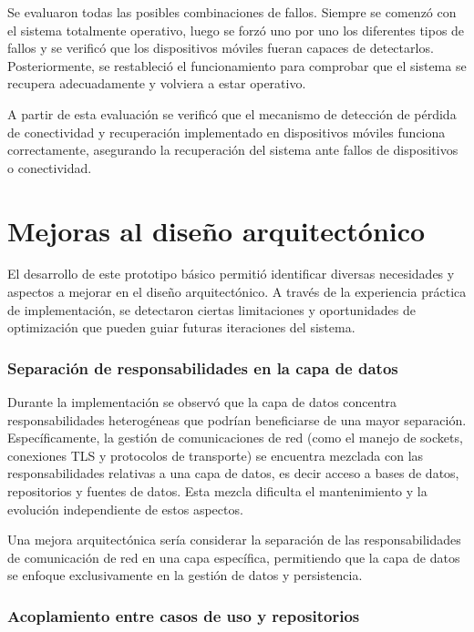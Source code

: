     Se evaluaron todas las posibles combinaciones de fallos. Siempre se comenzó con el sistema totalmente operativo, luego se forzó uno por uno los diferentes tipos de fallos y se verificó que los dispositivos móviles fueran capaces de detectarlos. Posteriormente, se restableció el funcionamiento para comprobar que el sistema se recupera adecuadamente y volviera a estar operativo.
    
    A partir de esta evaluación se verificó que el mecanismo de detección de pérdida de conectividad y recuperación implementado en dispositivos móviles funciona correctamente, asegurando la recuperación del sistema ante fallos de dispositivos o conectividad.

\section{Mejoras al diseño arquitectónico}

El desarrollo de este prototipo básico permitió identificar diversas necesidades y aspectos a mejorar en el diseño arquitectónico. A través de la experiencia práctica de implementación, se detectaron ciertas limitaciones y oportunidades de optimización que pueden guiar futuras iteraciones del sistema.

\subsubsection{Separación de responsabilidades en la capa de datos}

Durante la implementación se observó que la capa de datos concentra responsabilidades heterogéneas que podrían beneficiarse de una mayor separación. Específicamente, la gestión de comunicaciones de red (como el manejo de sockets, conexiones TLS y protocolos de transporte) se encuentra mezclada con las responsabilidades relativas a una capa de datos, es decir acceso a bases de datos, repositorios y fuentes de datos. Esta mezcla dificulta el mantenimiento y la evolución independiente de estos aspectos.

Una mejora arquitectónica sería considerar la separación de las responsabilidades de comunicación de red en una capa específica, permitiendo que la capa de datos se enfoque exclusivamente en la gestión de datos y persistencia.

\subsubsection{Acoplamiento entre casos de uso y repositorios}

